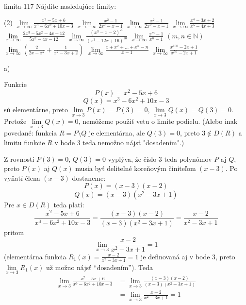 \begin{defproblem}{limita-117}
Nájdite nasledujúce limity:

\begin{tasks}(2)
    \task $\lim\limits_{{x \to \infty}} \frac{x^2-5x+6}{x^3-6x^2+10x-3}$
    \task $\lim\limits_{{x \to -\infty}} \frac{x^2-1}{2x^2-x-1}$
    \task $\lim\limits_{{x \to \infty}} \frac{x^2-1}{2x^2-x-1}$
    \task $\lim\limits_{{x \to \infty}} \frac{x^4-3x+2}{x^5-4x+3}$
    \task $\lim\limits_{{x \to \infty}} \frac{2x^3-5x^2-4x+12}{5x^2-4x-12}$
    \task $\lim\limits_{{x \to \infty}} \frac{(x^3-x-2)^{20}}{(x^3-12x+16)^{10}}$
    \task $\lim\limits_{{x \to \infty}} \frac{x^m-1}{x^n-1}$ $(m,n \in \mathbb{N})$
    \task $\lim\limits_{{x \to \infty}} (\frac{2}{2x-x^2}+\frac{1}{x^2-3x+2})$
    \task $\lim\limits_{{x \to \infty}} \frac{x+x^2+...+x^n-n}{x-1}$
    \task $\lim\limits_{{x \to \infty}} \frac{x^{100}-2x+1}{x^{50}-2x+1}$
\end{tasks}
\begin{solution}
    a)

    Funkcie
    \[
        P(x) = x^2 - 5x + 6
    \]
    \[
        Q(x) = x^3 - 6x^2 + 10x - 3
    \]
    sú elementárne, preto $\lim\limits_{x \to 3} P(x) = P(3) = 0$, $\lim\limits_{x
    \to 3} Q(x) = Q(3) = 0$. Pretože $\lim\limits_{x \to 3} Q(x) = 0$,
    nemôžeme použiť vetu o limite podielu. (Alebo inak povedané: funkcia $R = P
    \setminus Q$ je elementárna, ale $Q(3) = 0$, preto $3 \notin D(R)$ a limitu
    funkcie $R$ v bode $3$ teda nemožno nájsť "dosadením".)

    Z rovností $P(3) = 0$, $Q(3) = 0$ vyplýva, že číslo $3$ teda polynómov $P$
    aj $Q$, preto $P(x)$ aj $Q(x)$ musia byť deliteľné koreňovým činiteľom $(x -
    3)$. Po vyňatí člena $(x - 3)$ dostaneme:
    \[
        P(x)=(x - 3)(x - 2)
    \]
    \[
        Q(x)=(x - 3)(x^2 - 3x + 1)
    \]
    Pre $x \in D(R)$ teda platí:
    \[
        \frac{x^2 - 5x + 6}{x^3 - 6x^2 + 10x - 3}
            = \frac{(x - 3)(x - 2)}{(x - 3)(x^2 - 3x + 1)}
            = \frac{x-2}{x^2-3x+1}
    \]
    pritom
    \[
        \lim\limits_{x \to 3} \frac{x - 2}{x^2 - 3x + 1}=1
    \]
    (elementárna funkcia $R_1(x) = \frac{x - 2}{x^2 - 3x + 1}=1$ je
    definovaná aj v bode $3$, preto $\lim\limits_{x \to 3} R_1(x)$ už možno
    nájsť ``dosadením''). Teda
    \begin{align*}
        \lim\limits_{x \to 3} \frac{x^2 - 5x + 6}{x^3 - 6x^2 + 10x - 3}
        &= \lim\limits_{x \to 3} \frac{(x - 3)(x - 2)}{(x - 3)(x^2 - 3x + 1)} \\
        &= \lim\limits_{x \to 3} \frac{x - 2}{x^2 - 3x + 1} = 1
    \end{align*}
\end{solution}
\end{defproblem}

